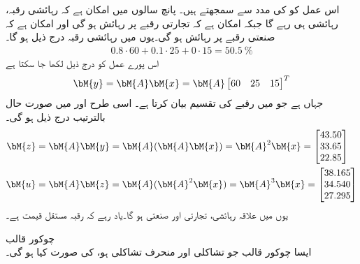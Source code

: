 اس عمل کو  کی مدد سے سمجھتے ہیں۔ پانچ سالوں میں  امکان ہے کہ رہائشی رقبہ، رہائشی ہی رہے گا جبکہ  امکان ہے کہ تجارتی رقبے پر رہائش ہو گی اور  امکان ہے کہ  صنعتی رقبے پر رہائش ہو گی۔یوں  میں رہائشی رقبہ درج ذیل ہو گا۔
\begin{align*}
0.8\cdot 60+0.1\cdot 25+0\cdot 15=\SI{50.5}{\percent}
\end{align*}
اس پورے عمل کو درج ذیل لکھا جا سکتا  ہے
\begin{align*}
\bM{y}=\bM{A}\bM{x}=\bM{A}\begin{bmatrix} 60&25&15 \end{bmatrix}^T
\end{align*}
جہاں   ہے جو  میں رقبے کی تقسیم بیان کرتا ہے۔ اسی طرح  اور  میں صورت حال بالترتیب درج ذیل ہو گی۔
\begin{align*}
\bM{z}&=\bM{A}\bM{y}=\bM{A}(\bM{A}\bM{x})=\bM{A}^2\bM{x}=\begin{bmatrix*}[l]43.50\\33.65\\22.85  \end{bmatrix*}\\
\bM{u}&=\bM{A}\bM{z}=\bM{A}(\bM{A}^2\bM{x})=\bM{A}^3\bM{x}=\begin{bmatrix*}[l]38.165\\34.540\\27.295  \end{bmatrix*}
\end{align*}
یوں  میں  علاقہ رہائشی،  تجارتی اور  صنعتی ہو گا۔یاد رہے کہ رقبہ مستقل قیمت ہے۔

\quad چوکور قالب\\
ایسا چوکور قالب جو تشاکلی اور منحرف تشاکلی ہو، کی صورت کیا ہو گی۔

